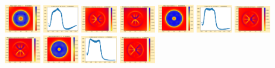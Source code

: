 \documentclass[11pt]{article}
\begin{document}
\includegraphics[width=0.11875\textwidth]{frame0005fig0.png}
\includegraphics[width=0.11875\textwidth]{frame0005fig1.png}
\includegraphics[width=0.11875\textwidth]{frame0005fig2.png}
\includegraphics[width=0.11875\textwidth]{frame0005fig3.png}
\vskip 10pt 
\includegraphics[width=0.11875\textwidth]{frame0006fig0.png}
\includegraphics[width=0.11875\textwidth]{frame0006fig1.png}
\includegraphics[width=0.11875\textwidth]{frame0006fig2.png}
\includegraphics[width=0.11875\textwidth]{frame0006fig3.png}
\includegraphics[width=0.11875\textwidth]{frame0007fig0.png}
\includegraphics[width=0.11875\textwidth]{frame0007fig1.png}
\includegraphics[width=0.11875\textwidth]{frame0007fig2.png}
\end{document}
